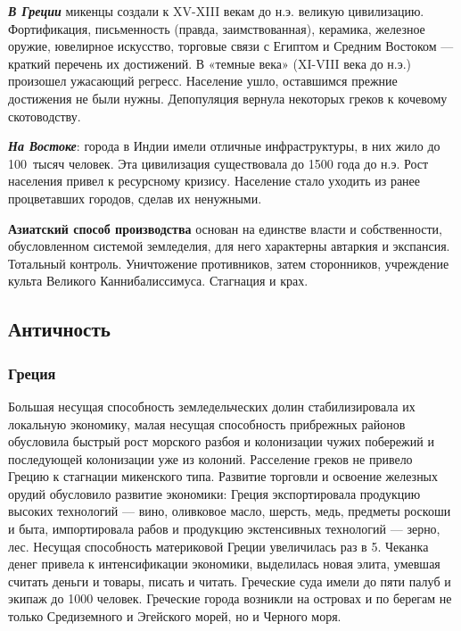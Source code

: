 \textbf{\textit{В Греции}} микенцы создали к \foreignlanguage{english}{XV}{}-\foreignlanguage{english}{XIII} векам до
н.э. великую цивилизацию. Фортификация, письменность (правда, заимствованная), керамика, железное оружие, ювелирное
искусство, торговые связи с Египтом и Средним Востоком — краткий перечень их достижений. В «темные века»
(\foreignlanguage{english}{XI}{}-\foreignlanguage{english}{VIII} века до н.э.) произошел ужасающий регресс. Население
ушло, оставшимся прежние достижения не были нужны. Депопуляция вернула некоторых греков к кочевому скотоводству.

\textbf{\textit{На Востоке}}: города в Индии имели отличные инфраструктуры, в них жило до 100~тысяч человек. Эта
цивилизация существовала до 1500 года до н.э. Рост населения привел к ресурсному кризису. Население стало уходить из
ранее процветавших городов, сделав их ненужными.

\textbf{Азиатский способ производства} основан на единстве власти и собственности, обусловленном системой земледелия,
для него характерны автаркия и экспансия. Тотальный контроль. Уничтожение противников, затем сторонников, учреждение
культа Великого Каннибалиссимуса. Стагнация и крах.

\subsection[Античность]{Античность}
\subsubsection[Греция ]{Греция }
Большая несущая способность земледельческих долин стабилизировала их локальную экономику, малая несущая способность
прибрежных районов обусловила быстрый рост морского разбоя и колонизации чужих побережий и последующей колонизации уже
из колоний. Расселение греков не привело Грецию к стагнации микенского типа. Развитие торговли и освоение железных
орудий обусловило развитие экономики: Греция экспортировала продукцию высоких технологий — вино, оливковое масло,
шерсть, медь, предметы роскоши и быта, импортировала рабов и продукцию экстенсивных технологий — зерно, лес. Несущая
способность материковой Греции увеличилась раз в 5. Чеканка денег привела к интенсификации экономики, выделилась новая
элита, умевшая считать деньги и товары, писать и читать. Греческие суда имели до пяти палуб и экипаж до 1000 человек.
Греческие города возникли на островах и по берегам не только Средиземного и Эгейского морей, но и Черного моря.

